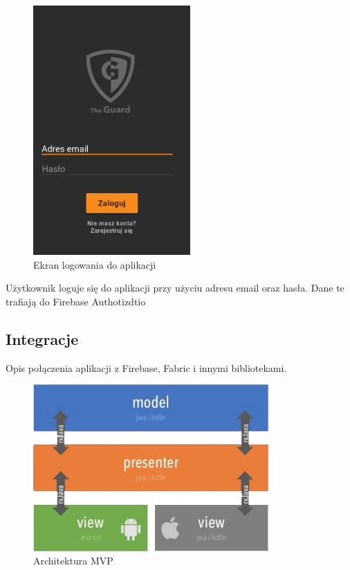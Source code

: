 \begin{figure}[ht]
	\centering
	\includegraphics[width=6cm]{Logowanie}
	\caption{Ekran logowania do aplikacji}
\end{figure}

Użytkownik loguje się do aplikacji przy użyciu adresu email oraz hasła. Dane te trafiają do Firebase Authotizdtio

\subsection*{Integracje}
Opis połączenia aplikacji z Firebase, Fabric i innymi bibliotekami.

\begin{figure}[ht]
    \centering
    \includegraphics[width=9cm]{ios_screenshots/android_architecture.png}
    \caption{Architektura MVP}
\end{figure}

